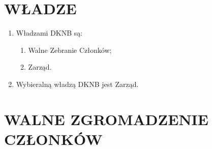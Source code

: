 \documentclass{article}
\begin{document}
\section{WŁADZE}

  \begin{enumerate}
    \item Władzami DKNB są:
      \begin{enumerate}
        \item Walne Zebranie Członków;
        \item Zarząd.
      \end{enumerate}
    \item Wybieralną władzą DKNB jest Zarząd.
  \end{enumerate}

\section{WALNE ZGROMADZENIE CZŁONKÓW}
\end{document}
